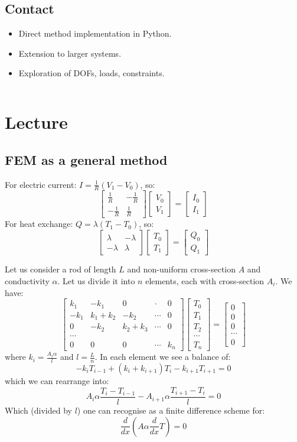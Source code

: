 \documentclass{article}
\newcommand{\mat}[1]{\left[\begin{matrix}#1\end{matrix}\right]}
\newcommand{\vectwo}[2]{\left[\begin{matrix}#1\\#2\end{matrix}\right]}
\newcommand{\mattwo}[4]{\left[\begin{matrix}#1 & #3\\#2 & #4\end{matrix}\right]}
\begin{document}
\subsection*{Contact}

\begin{itemize}
    \item Direct method implementation in Python.
    \item Extension to larger systems.
    \item Exploration of DOFs, loads, constraints.
\end{itemize}
\inputminted{python}{truss.py}

\section{Lecture}
\subsection{FEM as a general method}
For electric current: $I = \frac{1}{R}(V_1-V_0)$, so:
\[\mattwo{\frac{1}{R}}{-\frac{1}{R}}{-\frac{1}{R}}{\frac{1}{R}}\vectwo{V_0}{V_1}=\vectwo{I_0}{I_1}\]
For heat exchange: $Q = \lambda(T_1-T_0)$, so:
\[\mattwo{\lambda}{-\lambda}{-\lambda}{\lambda}\vectwo{T_0}{T_1}=\vectwo{Q_0}{Q_1}\]

Let us consider a rod of length $L$ and non-uniform cross-section $A$ and conductivity $\alpha$. Let us divide it into $n$ elements, each with cross-section $A_i$. We have:
\[\mat{k_1 & -k_1 & 0 & \cdot & 0\\
-k_1 & k_1+k_2 & -k_2 &  \cdots & 0\\
0 & -k_2 & k_2+k_3 & \cdots & 0\\
\cdots\\
0 & 0 & 0 & \cdots & k_n}\mat{T_0\\T_1\\T_2\\\cdots\\T_n} = \mat{0\\0\\0\\\cdots\\0}\]
where $k_i=\frac{A_i\alpha}{l}$ and $l=\frac{L}{n}$. In each element we see a balance of:
\[-k_iT_{i-1}+(k_i+k_{i+1})T_{i}-k_{i+1}T_{i+1} = 0\]
which we can rearrange into:
\[A_i\alpha\frac{T_{i}-T_{i-1}}{l}-A_{i+1}\alpha\frac{T_{i+1}-T_{i}}{l} = 0\]
Which (divided by $l$) one can recognise as a finite difference scheme for:
\[\frac{d}{dx}\left(A\alpha\frac{d}{dx}T\right)=0\]
\end{document}
